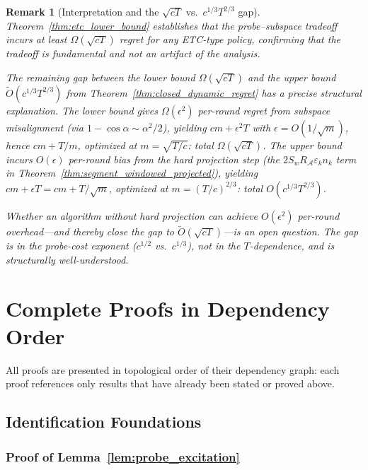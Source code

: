 \documentclass{article}
\newcommand{\cA}{\mathcal{A}}
\newtheorem{remark}{Remark}
\begin{document}
\begin{remark}[Interpretation and the $\sqrt{cT}$ vs.\ $c^{1/3}T^{2/3}$ gap]
\label{rem:etc_lb_interpretation}
Theorem~\ref{thm:etc_lower_bound} establishes that the probe--subspace tradeoff incurs at least $\Omega(\sqrt{cT})$ regret for any ETC-type policy, confirming that the tradeoff is fundamental and not an artifact of the analysis.

The remaining gap between the lower bound $\Omega(\sqrt{cT})$ and the upper bound $\widetilde{O}(c^{1/3}T^{2/3})$ from Theorem~\ref{thm:closed_dynamic_regret} has a precise structural explanation.
The lower bound gives $\Omega(\epsilon^2)$ per-round regret from subspace misalignment (via $1-\cos\alpha \sim \alpha^2/2$), yielding $cm + \epsilon^2 T$ with $\epsilon = O(1/\sqrt{m})$, hence $cm + T/m$, optimized at $m = \sqrt{T/c}$: total $\Omega(\sqrt{cT})$.
The upper bound incurs $O(\epsilon)$ per-round bias from the hard projection step (the $2S_wR_{\cA}\varepsilon_k n_k$ term in Theorem~\ref{thm:segment_windowed_projected}), yielding $cm + \epsilon T = cm + T/\sqrt{m}$, optimized at $m = (T/c)^{2/3}$: total $O(c^{1/3}T^{2/3})$.

Whether an algorithm without hard projection can achieve $O(\epsilon^2)$ per-round overhead---and thereby close the gap to $\widetilde{O}(\sqrt{cT})$---is an open question.
The gap is in the probe-cost exponent ($c^{1/2}$ vs.\ $c^{1/3}$), not in the $T$-dependence, and is structurally well-understood.
\end{remark}

\section{Complete Proofs in Dependency Order}
\label{app:all_proofs}
\label{app:main_proofs}

All proofs are presented in topological order of their dependency graph: each proof references only results that have already been stated or proved above.

\subsection{Identification Foundations}

\subsubsection{Proof of Lemma~\ref{lem:probe_excitation}}
\label{proof:probe_excitation}
\end{document}
